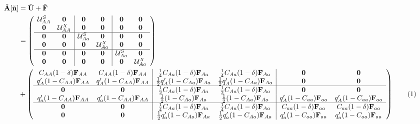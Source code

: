 \documentclass[11pt]{article}
\newcommand\numberthis{\addtocounter{equation}{1}\tag{\theequation}}
\def\mbf#1{\mathbf{#1}}
\def\mcal#1{\mathcal{#1}}
\begin{document}
{
\small
\begin{align*} \label{eq:AtildeCoexistence}
	\tilde{\mbf{A}}[\tilde{\mbf{n}}] &= \tilde{\mbf{U}} + \tilde{\mbf{F}}\\
		&= \left(
			\begin{array}{cc|cc|cc}
				\mcal{U}^S_{AA} & \mbf{0} & \mbf{0} & \mbf{0} & \mbf{0} & \mbf{0} \\ 
				\mbf{0} & \mcal{U}^X_{AA} & \mbf{0} & \mbf{0} & \mbf{0} & \mbf{0} \\\hline
				\mbf{0} & \mbf{0} & \mcal{U}^S_{Aa} & \mbf{0} & \mbf{0} & \mbf{0} \\
				\mbf{0} & \mbf{0} & \mbf{0} & \mcal{U}^X_{Aa} & \mbf{0} &  \mbf{0}\\\hline
				\mbf{0} & \mbf{0} & \mbf{0} & \mbf{0} & \mcal{U}^S_{Aa} & \mbf{0} \\ 
				\mbf{0} & \mbf{0} & \mbf{0} & \mbf{0} & \mbf{0} & \mcal{U}^X_{Aa}
			\end{array} \right) \\ 
		&+ \left(
			\begin{array}{cc|cc|cc}
				C_{AA} (1 - \delta) \mbf{F}_{AA} & C_{AA} (1 - \delta) \mbf{F}_{AA}  & \frac{1}{4} C_{Aa} (1 - \delta) \mbf{F}_{Aa} & \frac{1}{4} C_{Aa} (1 - \delta) \mbf{F}_{Aa} & \mbf{0} & \mbf{0} \\ 
				q^{\prime}_{A}  (1 - C_{AA}) \mbf{F}_{AA}& q^{\prime}_{A} (1 - C_{AA}) \mbf{F}_{AA} & \frac{1}{2} q^{\prime}_{A} (1 - C_{Aa})\mbf{F}_{Aa}  & \frac{1}{2} q^{\prime}_{A} (1 - C_{Aa})\mbf{F}_{Aa}  & \mbf{0} & \mbf{0} \\ \hline
				\mbf{0} & \mbf{0} & \frac{1}{2} C_{Aa} (1 - \delta) \mbf{F}_{Aa} & \frac{1}{2} C_{Aa} (1 - \delta) \mbf{F}_{Aa}& \mbf{0} & \mbf{0} \\
				q^{\prime}_{a} (1 - C_{AA}) \mbf{F}_{AA} & q^{\prime}_{a}(1 - C_{AA})  \mbf{F}_{AA} & \frac{1}{2}  (1 - C_{Aa}) \mbf{F}_{Aa}& \frac{1}{2} (1 - C_{Aa})\mbf{F}_{Aa} & q^{\prime}_{A} (1 - C_{aa})\mbf{F}_{aa}  & q^{\prime}_{A}  (1 - C_{aa})\mbf{F}_{aa}\\ \hline
				\mbf{0} & \mbf{0} & \frac{1}{4} C_{Aa} (1 - \delta) \mbf{F}_{Aa} & \frac{1}{4} C_{Aa} (1 - \delta) \mbf{F}_{Aa} & C_{aa} (1 - \delta) \mbf{F}_{aa} &  C_{aa} (1 - \delta) \mbf{F}_{aa}\\ 
				\mbf{0} & \mbf{0} & \frac{1}{2} q^{\prime}_{a}  (1 - C_{Aa}) \mbf{F}_{Aa} & \frac{1}{2} q^{\prime}_{a}  (1 - C_{Aa})\mbf{F}_{Aa}& q^{\prime}_{a}(1 - C_{aa})  \mbf{F}_{aa} & q^{\prime}_{a} (1 - C_{aa})\mbf{F}_{aa} 
			\end{array} \right) \numberthis
\end{align*}
}
\end{document}
